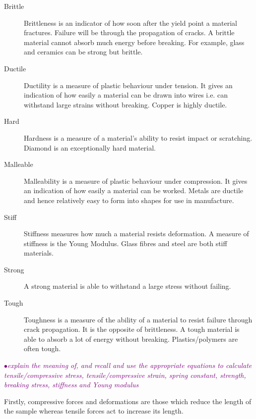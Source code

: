 \documentclass[a4paper,11pt,twoside]{memoir}
\newcounter{spec}[chapter]
\newcommand{\spec}[1]{\Needspace{5\baselineskip}\textcolor{purple}{$\bullet$\hspace{0.5cm}\textit{#1}}}
\begin{document}
\begin{description}
    \item[Brittle] Brittleness is an indicator of how soon after the yield point a material fractures. Failure will be through the propagation of cracks. A brittle material cannot absorb much energy before breaking. For example, glass and ceramics can be strong but brittle.
    \item[Ductile] Ductility is a measure of plastic behaviour under tension. It gives an indication of how easily a material can be drawn into wires i.e. can withstand large strains without breaking. Copper is highly ductile.
    \item[Hard] Hardness is a measure of a material's ability to resist impact or scratching. Diamond is an exceptionally hard material.
    \item[Malleable] Malleability is a measure of plastic behaviour under compression. It gives an indication of how easily a material can be worked. Metals are ductile and hence relatively easy to form into shapes for use in manufacture.
    \item[Stiff] Stiffness measures how much a material resists deformation. A measure of stiffness is the Young Modulus. Glass fibres and steel are both stiff materials.
    \item[Strong] A strong material is able to withstand a large stress without failing.
    \item[Tough] Toughness is a measure of the ability of a material to resist failure through crack propagation. It is the opposite of brittleness. A tough material is able to absorb a lot of energy without breaking. Plastics/polymers are often tough.
\end{description}

\spec{explain the meaning of,  and recall and use the appropriate equations to calculate tensile/compressive stress, tensile/compressive strain, spring constant, strength, breaking stress, stiffness and Young modulus}

Firstly, compressive forces and deformations are those which reduce the length of the sample whereas tensile forces act to increase its length.
\end{document}
